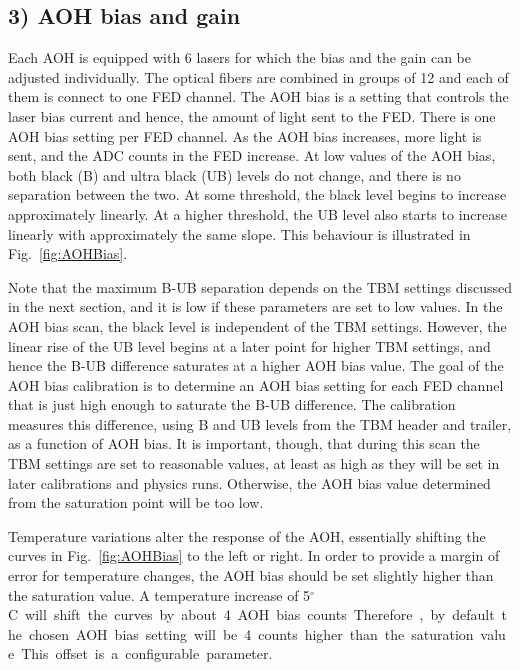 \subsection*{3) AOH bias and gain}

Each AOH is equipped with 6 lasers for which the bias and the gain can be adjusted individually. The optical fibers are combined in groups of 12 and each of them is connect to one FED channel.
The AOH bias is a setting that controls the laser bias current and hence, the amount of light sent to the FED. There is one AOH bias setting per FED channel.
As the AOH bias increases, more light is sent, and the ADC counts in the FED increase.
At low values of the AOH bias, both black (B) and ultra black (UB) levels do not change, and there is no separation between the two.
At some threshold, the black level begins to increase approximately linearly.
At a higher threshold, the UB level also starts to increase linearly with approximately the same slope. This behaviour is illustrated in Fig.~\ref{fig:AOHBias}.

Note that the maximum B-UB separation depends on the TBM settings discussed in the next section, and it is low if these parameters are set to low values.
In the AOH bias scan, the black level is independent of the TBM settings.
However, the linear rise of the UB level begins at a later point for higher TBM settings, and hence the B-UB difference saturates at a higher AOH bias value.
The goal of the AOH bias calibration is to determine an AOH bias setting for each FED channel that is just high enough to saturate the B-UB difference.
The calibration measures this difference, using B and UB levels from the TBM header and trailer, as a function of AOH bias.
It is important, though, that during this scan the TBM settings are set to reasonable values, at least as high as they will be set in later calibrations and physics runs.
Otherwise, the AOH bias value determined from the saturation point will be too low.

Temperature variations alter the response of the AOH, essentially shifting the curves in Fig.~\ref{fig:AOHBias} to the left or right.
In order to provide a margin of error for temperature changes, the AOH bias should be set slightly higher than the saturation value.
A temperature increase of 5\unit{$^\circ$C} will shift the curves by about 4 AOH bias counts.
Therefore, by default the chosen AOH bias setting will be 4 counts higher than the saturation value. This offset is a configurable parameter.

